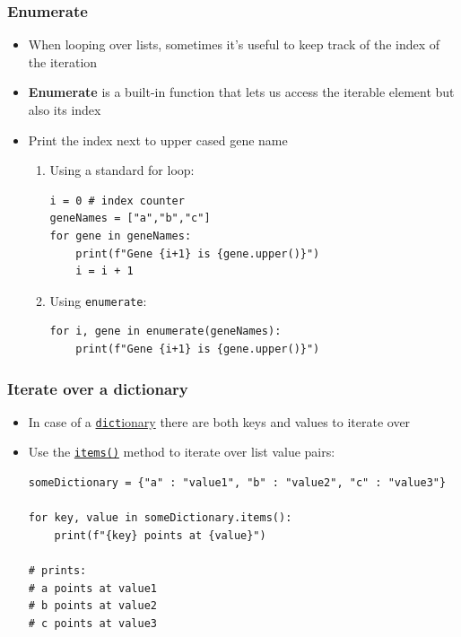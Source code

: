 \documentclass[xcolor=table]{beamer}
\begin{document}
\begin{frame}[fragile]
\frametitle{Enumerate}

\begin{itemize}\addtolength{\itemsep}{0.5\baselineskip}
\item<1-> When looping over lists, sometimes it's useful to keep track of the
index of the iteration

\item<2-> \textbf{Enumerate} is a built-in function that lets us access the
iterable element but also its index

\item<3-> Print the index next to upper cased gene name

\begin{enumerate}\addtolength{\itemsep}{-1\baselineskip}

\item<3-> Using a standard for loop:
\begin{lstlisting}[style=python]
i = 0 # index counter
geneNames = ["a","b","c"]
for gene in geneNames:
    print(f"Gene {i+1} is {gene.upper()}")
    i = i + 1
\end{lstlisting}

\item<4-> Using \texttt{enumerate}:
\begin{lstlisting}[style=python]
for i, gene in enumerate(geneNames):
    print(f"Gene {i+1} is {gene.upper()}")
\end{lstlisting}

\end{enumerate}
\end{itemize}

\end{frame}


\begin{frame}[fragile]
\frametitle{Iterate over a dictionary}
\begin{itemize}\addtolength{\itemsep}{0.5\baselineskip}
        \item In case of a \href{https://docs.python.org/3/library/stdtypes.html#dict}{\texttt{dict}ionary} there are both keys and values to iterate over
        \item Use the \href{https://docs.python.org/3/library/stdtypes.html#dict.items}{\texttt{items()}} method to iterate over list value pairs:
\begin{lstlisting}[style=python]
someDictionary = {"a" : "value1", "b" : "value2", "c" : "value3"}

for key, value in someDictionary.items():
    print(f"{key} points at {value}")

# prints:
# a points at value1
# b points at value2
# c points at value3
\end{lstlisting}
    \end{itemize}
\end{frame}
\end{document}
